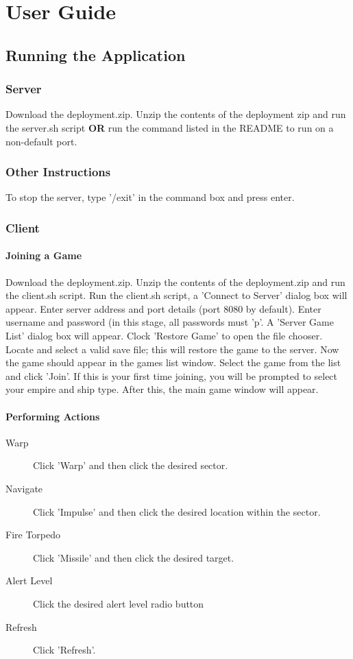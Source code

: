 \chapter{User Guide}

\section{Running the Application}

\subsection{Server}
Download the deployment.zip.
Unzip the contents of the deployment zip and run the server.sh script \textbf{OR}  run the command listed in the README to run on a non-default port.

\subsection{Other Instructions}
To stop the server, type '/exit' in the command box and press enter.

\subsection{Client}

\subsubsection{Joining a Game}
Download the deployment.zip.
Unzip the contents of the deployment.zip and run the client.sh script.
Run the client.sh script, a 'Connect to Server' dialog box will appear.
Enter server address and port details (port 8080 by default).
Enter username and password (in this stage, all passwords must 'p'.
A 'Server Game List' dialog box will appear.
Clock 'Restore Game' to open the file chooser.
Locate and select a valid save file; this will restore the game to the server.
Now the game should appear in the games list window.
Select the game from the list and click 'Join'.
If this is your first time joining, you will be prompted to select your empire and ship type.
After this, the main game window will appear.

\subsubsection{Performing Actions}
\begin{description}
    \item [Warp]
    Click 'Warp' and then click the desired sector.
    \item [Navigate]
    Click 'Impulse' and then click the desired location within the sector.
    \item [Fire Torpedo]
    Click 'Missile' and then click the desired target.
    \item [Alert Level]
    Click the desired alert level radio button
    \item [Refresh]
    Click 'Refresh'.
\end{description}
